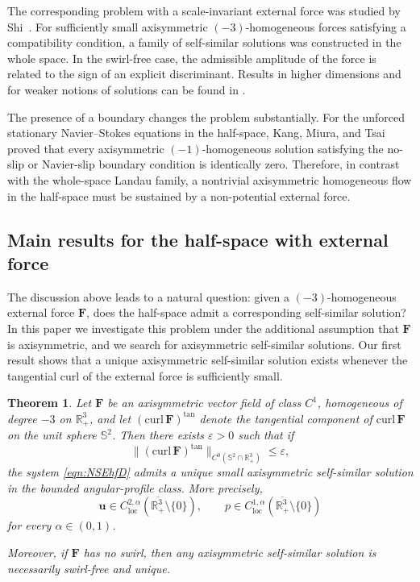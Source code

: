 \documentclass{amsart}
\newtheorem{theorem}{Theorem}[section]
\newcommand{\curl}{\mathrm{curl}}
\newcommand{\Bu}{{\boldsymbol{u}}}
\newcommand{\BF}{{\boldsymbol{F}}}
\begin{document}
The corresponding problem with a scale-invariant external force was
studied by Shi~\cite{Shi18}. For sufficiently small axisymmetric
$(-3)$-homogeneous forces satisfying a compatibility condition, a
family of self-similar solutions was constructed in the whole space.
In the swirl-free case, the admissible amplitude of the force is
related to the sign of an explicit discriminant. Results in higher
dimensions and for weaker notions of solutions can be found in
\cite{FR96,Tsai98,BGLWX23,BGLWX25}.

The presence of a boundary changes the problem substantially. For
the unforced stationary Navier--Stokes equations in the half-space,
Kang, Miura, and Tsai~\cite[Theorem~5.1]{KMT18} proved that every
axisymmetric $(-1)$-homogeneous solution satisfying the no-slip or
Navier-slip boundary condition is identically zero. Therefore, in
contrast with the whole-space Landau family, a nontrivial
axisymmetric homogeneous flow in the half-space must be sustained by
a non-potential external force.

\subsection{Main results for the half-space with external force}

The discussion above leads to a natural question: given a $(-3)$-homogeneous external force $\BF$, does the half-space admit a corresponding self-similar solution? 
In this paper we investigate this problem under the additional assumption that $\BF$ is axisymmetric, and we search for axisymmetric self-similar solutions.
Our first result shows that a unique axisymmetric self-similar solution exists whenever the tangential curl of the external force is sufficiently small.


\begin{theorem}\label{thm:A}
Let $\BF$ be an axisymmetric vector field of class $C^1$, homogeneous of degree $-3$ on $\mathbb{R}^3_+$, and let $(\curl\,\BF)^{\tan}$ denote the tangential component of $\curl\,\BF$ on the unit sphere $\mathbb{S}^2$.
Then there exists $\varepsilon>0$ such that if
\[
\|(\curl\,\BF)^{\tan}\|_{C^0(\mathbb{S}^2\cap\mathbb{R}^3_+)} \le \varepsilon,
\]
the system \eqref{eqn:NSEhfD} admits a unique \emph{small axisymmetric self-similar solution in the bounded angular-profile class}. More precisely,
\[
\Bu\in C^{2,\alpha}_{\mathrm{loc}}(\overline{\mathbb R^3_+}\setminus\{0\}),
\qquad p\in C^{1,\alpha}_{\mathrm{loc}}(\overline{\mathbb R^3_+}\setminus\{0\})
\]
for every $\alpha\in(0,1)$.

Moreover, if $\BF$ has no swirl, then any axisymmetric self-similar solution is necessarily swirl-free and unique.
\end{theorem}
\end{document}
